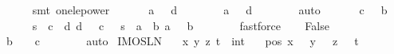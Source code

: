 \begin{isabellebody}
\ \ \ \ \isamarkupfalse%
\ {\isacharparenleft}smt\ one{\isacharunderscore}le{\isacharunderscore}power{\isacharparenright}\isanewline
\ \ \isamarkupfalse%
\isanewline
\ \ \isamarkupfalse%
\ {\isachardoublequoteopen}a\ {\isasymnoteq}\ {}{\isachardoublequoteclose}\ {\isachardoublequoteopen}d\ {\isasymnoteq}\ {}{\isachardoublequoteclose}\isanewline
\ \ \ \ \isamarkupfalse%
\ {\isacharbackquoteopen}a\ {\isachargreater}\ {}{\isacharbackquoteclose}\ {\isacharbackquoteopen}d\ {\isachargreater}\ {}{\isacharbackquoteclose}\isanewline
\ \ \ \ \isamarkupfalse%
\ auto\isanewline
\ \ \isamarkupfalse%
\isanewline
\ \ \isamarkupfalse%
\ {\isachardoublequoteopen}c\ {\isacharequal}\ {}{\isachardoublequoteclose}\ {\isachardoublequoteopen}b\ {\isacharequal}\ {}{\isachardoublequoteclose}\isanewline
\ \ \ \ \isamarkupfalse%
\ {\isacharbackquoteopen}s{\isacharcircum}{}\ {\isacharequal}\ c{\isacharcircum}{}\ {\isacharplus}\ d{\isacharcircum}{}{\isacharbackquoteclose}\ {\isacharbackquoteopen}d\ {\isasymge}\ {}{\isacharbackquoteclose}\ {\isacharbackquoteopen}c\ {\isasymge}\ {}{\isacharbackquoteclose}\ {\isacharbackquoteopen}s{\isacharcircum}{}\ {\isacharequal}\ a{\isacharcircum}{}\ {\isacharplus}\ b{\isacharcircum}{}{\isacharbackquoteclose}\ {\isacharbackquoteopen}a\ {\isasymge}\ {}{\isacharbackquoteclose}\ {\isacharbackquoteopen}b\ {\isasymge}\ {}{\isacharbackquoteclose}\isanewline
\ \ \ \ \isamarkupfalse%
\ fastforce{\isacharplus}\isanewline
\ \ \isamarkupfalse%
\ False\isanewline
\ \ \ \ \isamarkupfalse%
\ {\isacharbackquoteopen}b\ {\isachargreater}\ {}\ {\isasymor}\ c\ {\isachargreater}\ {}{\isacharbackquoteclose}\isanewline
\ \ \ \ \isamarkupfalse%
\ auto\isanewline
{}\isamarkupfalse%
%
\endisatagproof
{\isafoldproof}%
%
\isadelimproof
\isanewline
%
\endisadelimproof
\isanewline
{}\isamarkupfalse%
\ IMO{}{}{}{}SL{\isacharunderscore}N{}{\isacharcolon}\isanewline
\ \ \ x\ y\ z\ t\ {\isacharcolon}{\isacharcolon}\ int\isanewline
\ \ \ pos{\isacharcolon}\ {\isachardoublequoteopen}x\ {\isachargreater}\ {}{\isachardoublequoteclose}\ {\isachardoublequoteopen}y\ {\isachargreater}\ {}{\isachardoublequoteclose}\ {\isachardoublequoteopen}z\ {\isachargreater}\ {}{\isachardoublequoteclose}\ {\isachardoublequoteopen}t\ {\isachargreater}\ {}{\isachardoublequoteclose}\isanewline

\end{isabellebody}
